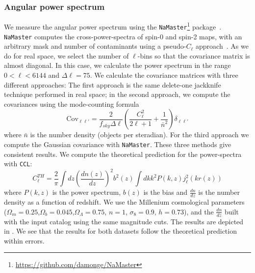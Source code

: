 \documentclass[twocolumn]{aastex62}
\begin{document}
\subsubsection{Angular power spectrum}
We measure the angular power spectrum using the \texttt{NaMaster}\footnote{\url{https://github.com/damonge/NaMaster}} package~\citep{Namaster}. \texttt{NaMaster} computes the cross-power-spectra of spin-0 and spin-2 maps, with an arbitrary mask and number of contaminants using a pseudo-$C_{\ell}$ approach~\citep{2002ApJ...567....2H,2017MNRAS.465.1847E}. As we do for real space, we select the number of $\ell$-bins so that the covariance matrix is almost diagonal. In this case, we calculate the power spectrum in the range $0 < \ell < 6144$ and $\Delta \ell = 75$. We calculate the covariance matrices with three different approaches: The first approach is the same delete-one jackknife technique performed in real space; in the second approach, we compute the covariances using the mode-counting formula~\citep{Dodelson:1282338,2007MNRAS.381.1347C}
\begin{equation}
\mathrm{Cov}_{\ell\ell'}=\frac{2}{f_{sky}\Delta\ell}\left(\frac{C_{\ell}^{2}}{2\ell+1}+\frac{1}{\bar{n}^{2}}\right)\delta_{\ell\ell'}
\end{equation}
where $\bar{n}$ is the number density (objects per steradian). For the third approach we compute the Gaussian covariance with \texttt{NaMaster}. These three methods give consistent results. We compute the theoretical prediction for the power-spectra with \texttt{CCL}:
\begin{equation}
C_{\ell}^{TH} = \frac{2}{\pi}\int{dz} \left(\frac{dn(z)}{dz}\right)^{2} b^{2}(z) \int{dk k^{2} P(k,z)j^{2}_{\ell}(kr(z))}
\end{equation}
where $P(k,z)$ is the power spectrum, $b(z)$ is the bias and $\frac{dn}{dz}$ is the number density as a function of redshift. We use the Millenium cosmological parameters~\citep{2005Nature.435.629S} ($\Omega_{m}=0.25$,$\Omega_{b}=0.045$,$\Omega_{\Lambda}=0.75$, $n=1$, $\sigma_{8}=0.9$, $h=0.73$), and the $\frac{dn}{dz}$ built with the input catalog using the same magnitude cuts. The results are depicted in . We see that the results for both datasets follow the theoretical prediction within errors.
\end{document}

